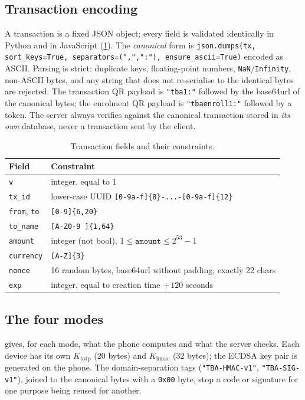 \subsection{Transaction encoding}
A transaction is a fixed JSON object; every field is validated identically in
Python and in JavaScript (\cref{tab:txfields}). The \emph{canonical} form is
\texttt{json.dumps(tx, sort\_keys=True, separators=(",",":"), ensure\_ascii=True)}
encoded as ASCII. Parsing is strict: duplicate keys, floating-point numbers,
\texttt{NaN}/\texttt{Infinity}, non-ASCII bytes, and any string that does not
re-serialise to the identical bytes are rejected. The transaction QR payload is
\texttt{"tba1:"} followed by the base64url of the canonical bytes; the enrolment
QR payload is \texttt{"tbaenroll1:"} followed by a token. The server always
verifies against the canonical transaction stored in \emph{its own} database,
never a transaction sent by the client.

\begin{table}[htbp]
\centering
\caption{Transaction fields and their constraints.}
\label{tab:txfields}
\small
\begin{tabularx}{\linewidth}{@{}lX@{}}
\toprule
Field & Constraint \\
\midrule
\texttt{v}        & integer, equal to 1 \\
\texttt{tx\_id}   & lower-case UUID \texttt{[0-9a-f]\{8\}-...-[0-9a-f]\{12\}} \\
\texttt{from}, \texttt{to} & \texttt{[0-9]\{6,20\}} \\
\texttt{to\_name} & \texttt{[A-Z0-9 ]\{1,64\}} \\
\texttt{amount}   & integer (not bool), $1 \le \texttt{amount} \le 2^{53}-1$ \\
\texttt{currency} & \texttt{[A-Z]\{3\}} \\
\texttt{nonce}    & 16 random bytes, base64url without padding, exactly 22 chars \\
\texttt{exp}      & integer, equal to creation time $+\,120$ seconds \\
\bottomrule
\end{tabularx}
\end{table}

\subsection{The four modes}
 gives, for each mode, what the phone computes and what the
server checks. Each device has its own $K_{\text{totp}}$ (20 bytes) and
$K_{\text{hmac}}$ (32 bytes); the ECDSA key pair is generated on the phone. The
domain-separation tags (\texttt{"TBA-HMAC-v1"}, \texttt{"TBA-SIG-v1"}), joined to
the canonical bytes with a \texttt{0x00} byte, stop a code or signature for one
purpose being reused for another.

